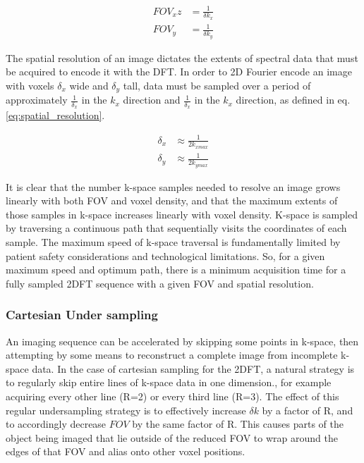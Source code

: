 \begin{equation}\label{eq:fov}
    \begin{aligned}
        FOV_x z &= \frac{1}{\delta k_x}\\
        FOV_y &= \frac{1}{\delta k_y}
    \end{aligned}
\end{equation}

The spatial resolution of an image dictates the extents of spectral data that must be acquired to encode it with the
DFT. In order to 2D Fourier encode an image with voxels $\delta_x$ wide and $\delta_y$ tall, data must be sampled over a
period of approximately $\frac{1}{\delta_x}$ in the $k_x$ direction and $\frac{1}{\delta_x}$ in the $k_x$ direction, as
defined in eq. \ref{eq:spatial_resolution}.


\begin{equation}\label{eq:spatial_resolution}
    \begin{aligned}
        \delta_x &\approx \frac{1}{2k_{xmax}}\\
        \delta_y &\approx \frac{1}{2k_{ymax}}
    \end{aligned}
\end{equation}

It is clear that the number k-space samples needed to resolve an image grows linearly with both FOV and voxel density,
and that the maximum extents of those samples in k-space increases linearly with voxel density. K-space is sampled by
traversing a continuous path that sequentially visits the coordinates of each sample. The maximum speed of k-space
traversal is fundamentally limited by patient safety considerations and technological limitations. So, for a given
maximum speed and optimum path, there is a minimum acquisition time for a fully sampled 2DFT sequence with a given FOV
and spatial resolution.

\subsubsection{Cartesian Under sampling}
An imaging sequence can be accelerated by skipping some points in k-space, then attempting by some means to reconstruct
a complete image from incomplete k-space data. In the case of cartesian sampling for the 2DFT, a natural strategy is to
regularly skip entire lines of k-space data in one dimension.\cite{Pruessmann1999}, for example acquiring every other
line (R=2) or every third line (R=3). The effect of this regular undersampling strategy is to effectively increase
$\delta k$ by a factor of R, and to accordingly decrease $FOV$ by the same factor of R. This causes parts of the object
being imaged that lie outside of the reduced FOV to wrap around the edges of that FOV and alias onto other voxel
positions.

